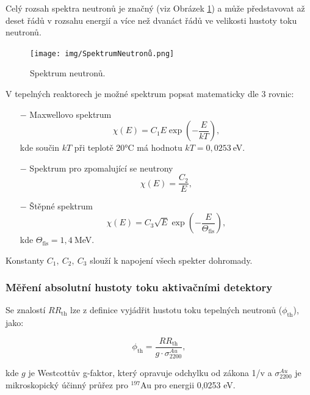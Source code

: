 Celý rozsah spektra neutronů je značný (viz Obrázek \ref{fig:SpektrumNeutronů}) a může představovat až deset řádů v rozsahu energií a více než dvanáct řádů ve velikosti hustoty toku neutronů.

\begin{figure}[H]
    \centering
    \texttt{[image: img/SpektrumNeutronů.png]}
    \caption{Spektrum neutronů.}
    \label{fig:SpektrumNeutronů}
\end{figure}

V tepelných reaktorech je možné spektrum popsat matematicky dle 3 rovnic:

\begin{itemize}
    \item [$-$] Maxwellovo spektrum
    \begin{equation*}
        \chi(E) = C_1 E \exp\left(-\frac{E}{kT}\right), 
    \end{equation*}
    kde součin $kT$ při teplotě 20°C má hodnotu $kT = 0,0253\ $eV.
    
    \item [$-$] Spektrum pro zpomalující se neutrony
    \begin{equation*}
        \chi(E) = \frac{C_2}{E}, 
    \end{equation*}
    
    \item [$-$] Štěpné spektrum
    \begin{equation*}
        \chi(E) = C_3 \sqrt{E} \exp\left(-\frac{E}{\Theta_\text{fis}}\right), 
    \end{equation*}
    kde $\Theta_\text{fis} =1,4\ $MeV.
\end{itemize}

Konstanty $C_1,\ C_2,\ C_3$ slouží k napojení všech spekter dohromady.

\subsubsection{Měření absolutní hustoty toku aktivačními detektory}

Se znalostí $RR_\text{th}$ lze z definice vyjádřit hustotu toku tepelných neutronů ($\phi_\text{th}$), jako:

\begin{equation} \label{phith}
   \phi_\text{th} = \frac{RR_\text{th}}{g \cdot \sigma^{Au}_\text{2200}},
\end{equation}

kde $g$ je Westcottův g-faktor, který opravuje odchylku od zákona 1/v a $\sigma^{Au}_\text{2200}$ je mikroskopický účinný průřez pro $^{197}$Au pro energii 0,0253 eV.

